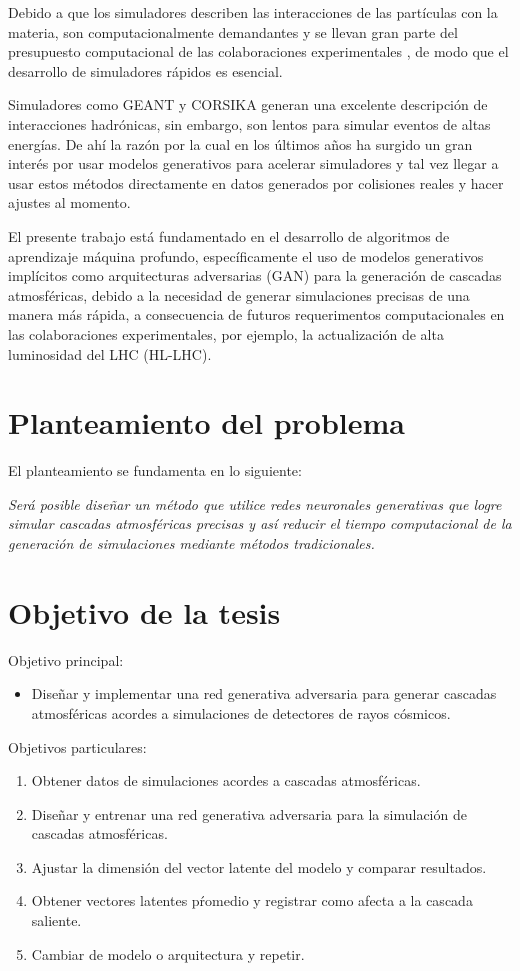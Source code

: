Debido a que los simuladores describen las interacciones de las partículas con la materia, son computacionalmente demandantes y se llevan gran parte del presupuesto computacional de las colaboraciones experimentales \parencite{Elmer2017}, de modo que el desarrollo de simuladores rápidos es esencial.

Simuladores como GEANT y CORSIKA generan una excelente descripción de interacciones hadrónicas, sin embargo, son lentos para simular eventos de altas energías. De ahí la razón por la cual en los últimos años ha surgido un gran interés por usar modelos generativos para acelerar simuladores y tal vez llegar a usar estos métodos directamente en datos generados por colisiones reales y hacer ajustes al momento.

El presente trabajo está fundamentado en el desarrollo de algoritmos de aprendizaje máquina profundo, específicamente el uso de modelos generativos implícitos como arquitecturas adversarias (GAN) para la generación de cascadas atmosféricas, debido a la necesidad de generar simulaciones precisas de una manera más rápida, a consecuencia de futuros requerimentos computacionales en las colaboraciones experimentales, por ejemplo, la actualización de alta luminosidad del LHC (HL-LHC)\parencite{Elmer2017}.

\section{Planteamiento del problema}

El planteamiento se fundamenta en lo siguiente:

\emph{Será posible diseñar un método que utilice redes neuronales generativas que logre simular cascadas atmosféricas precisas y así reducir el tiempo computacional de la generación de simulaciones mediante métodos tradicionales.}


\section{Objetivo de la tesis}
Objetivo principal:
\begin{itemize}
   \item Diseñar y implementar una red generativa adversaria para generar cascadas atmosféricas acordes a simulaciones de detectores de rayos cósmicos.
\end{itemize}

Objetivos particulares:
\renewcommand{\theenumi}{\roman{enumi}}%
\begin{enumerate}
   \item Obtener datos de simulaciones acordes a cascadas atmosféricas.
   \item Diseñar y entrenar una red generativa adversaria para la simulación de cascadas atmosféricas.
   \item Ajustar la dimensión del vector latente del modelo y comparar resultados.
   \item Obtener vectores latentes pŕomedio y registrar como afecta a la cascada saliente.
   \item Cambiar de modelo o arquitectura y repetir.
\end{enumerate}

